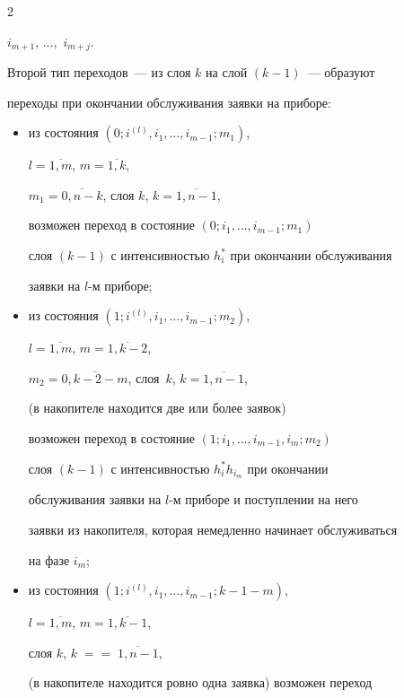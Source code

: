 \begin{multicols}{2}
\begin{itemize}
$i_{m+1},\,\ldots,$ $i_{m+j}$.


\end{itemize}





Второй тип переходов~--- из слоя $k$ на слой $(k-1)$~--- образуют


переходы при окончании обслуживания заявки на приборе:


\begin{itemize}


\item из состояния $\left(0;i^{(l)},i_1,\ldots,i_{m-1};m_1\right)$,


$l=\overline{1,m}$, $m=\overline{1,k}$,


$m_1=\overline{0,n-k}$, слоя $k$, $k=\overline{1,n-1}$,


возможен переход в состояние $\left(0;i_1,\ldots, i_{m-1};m_1\right)$


слоя $(k-1)$ с интенсивностью $h_i^*$ при окончании обслуживания


заявки на $l$-м приборе;


\item


 из состояния $\left(1;i^{(l)},i_1,\ldots,i_{m-1};m_2\right)$,


$l=\overline{1,m}$, $m=\overline{1,k-2}$,


$m_2=\overline{0,k-2-m}$, слоя~$k$, $k=\overline{1,n-1}$,


(в накопителе находится две или более заявок)


возможен переход в состояние $\left(1;i_1,\ldots,i_{m-1},i_m;m_2\right)$


слоя $(k-1)$ с интенсивностью $h_i^* h_{i_m}$ при окончании


обслуживания заявки на $l$-м приборе и поступлении на него


заявки из накопителя, которая немедленно начинает обслуживаться


на фазе $i_m$;


\item


 из состояния $\left(1;i^{(l)},i_1,\ldots,i_{m-1};k-1-m\right)$,


$l=\overline{1,m}$, $m=\overline{1,k-1}$,


слоя $k$, $k\;=$\linebreak $=\;\overline{1,n-1}$,


(в накопителе находится ровно одна заявка) возможен переход



\end{itemize}
\end{multicols}
